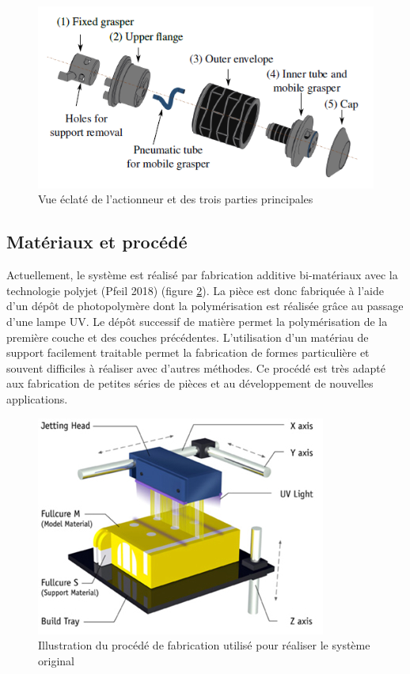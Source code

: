 \documentclass[10pt, a4paper]{article}
\begin{document}
\begin{figure}[ht!]
\centering
\includegraphics[scale=0.7]{ImageIntro/planInchworm.PNG}
\caption{ Vue éclaté de l'actionneur et des trois parties principales }
\label{fig:planInchworm}
\end{figure}
        
    \subsection{Matériaux et procédé}

        \qquad Actuellement, le système est réalisé par fabrication additive bi-matériaux avec la technologie polyjet (Pfeil 2018) (figure \ref{fig:fabPoly}). La pièce est donc fabriquée à l'aide d'un dépôt de photopolymère dont la polymérisation est réalisée grâce au passage d'une lampe UV. Le dépôt successif de matière permet la polymérisation de la première couche et des couches précédentes. L'utilisation d'un matériau de support facilement traitable permet la fabrication de formes particulière et souvent difficiles à réaliser avec d'autres méthodes. Ce procédé est très adapté aux fabrication de petites séries de pièces et au développement de nouvelles applications. 
        
\begin{figure}[ht!]
\centering
\includegraphics[scale=0.5]{ImageIntro/polyjet_process2.jpg}
\caption{ Illustration du procédé de fabrication utilisé pour réaliser le système original }
\label{fig:fabPoly}
\end{figure}        
\end{document}

